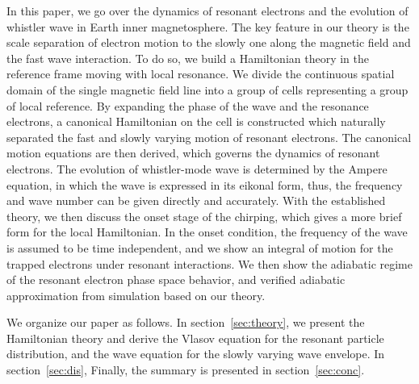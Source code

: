 In this paper, we go over the dynamics of resonant electrons and the evolution of whistler wave in Earth inner magnetosphere.
The key feature in our theory is the scale separation of electron motion to the slowly one along the magnetic field and the fast wave interaction. 
To do so, we build a Hamiltonian theory in the reference frame moving with local resonance.
We divide the continuous spatial domain of the single magnetic field line into a group of cells representing a group of local reference.
By expanding the phase of the wave and the resonance electrons, a canonical Hamiltonian on the cell is constructed which naturally separated the fast and slowly varying motion of resonant electrons.
The canonical motion equations are then derived, which governs the dynamics of resonant electrons. 
The evolution of whistler-mode wave is determined by the Ampere equation, in which the wave is expressed in its eikonal form, thus, the frequency and wave number can be given directly and accurately.
With the established theory, we then discuss the onset stage of the chirping, which gives a more brief form for the local Hamiltonian. 
In the onset condition, the frequency of the wave is assumed to be time independent, and we show an integral of motion for the trapped electrons under resonant interactions.
We then show the adiabatic regime of the resonant electron phase space behavior, and verified adiabatic approximation from simulation based on our theory.


We organize our paper as follows. In section~\ref{sec:theory}, we present the Hamiltonian theory and derive the Vlasov equation for the resonant particle distribution, and the wave equation for the slowly varying wave envelope.
In section~\ref{sec:dis}, 
Finally, the summary is presented in section~\ref{sec:conc}.
